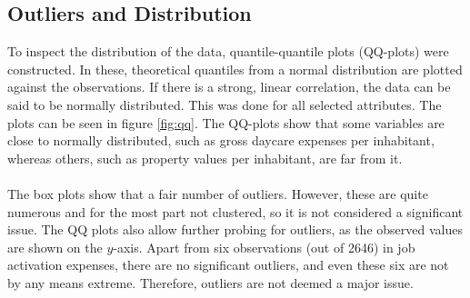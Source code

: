 \documentclass[11pt,fleqn]{article}
\numberwithin{footnote}{section}
\numberwithin{figure}{section}
\numberwithin{table}{section}
\begin{document}
\subsection{Outliers and Distribution}
To inspect the distribution of the data, quantile-quantile plots (QQ-plots) were constructed.
In these, theoretical quantiles from a normal distribution are plotted against the observations.
If there is a strong, linear correlation, the data can be said to be normally distributed.
This was done for all selected attributes.
The plots can be seen in figure \ref{fig:qq}.
The QQ-plots show that some variables are close to normally distributed, such as gross daycare expenses per inhabitant, whereas others, such as property values per inhabitant, are far from it.\\
\\
The box plots show that a fair number of outliers.
However, these are quite numerous and for the most part not clustered, so it is not considered a significant issue.
The QQ plots also allow further probing for outliers, as the observed values are shown on the $y$-axis.
Apart from six observations (out of 2646) in job activation expenses, there are no significant outliers, and even these six are not by any means extreme.
Therefore, outliers are not deemed a major issue.
\end{document}
